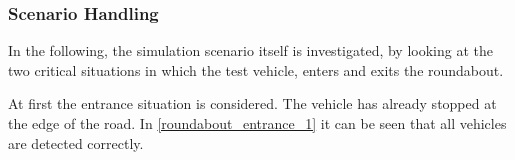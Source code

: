 \documentclass[11pt,oneside,openright]{mpreport}
\begin{document}
\subsubsection{Scenario Handling}
In the following, the simulation scenario itself is investigated, by looking at the two critical situations in which the test vehicle, enters and exits the roundabout.

At first the entrance situation is considered. The vehicle has already stopped at the edge of the road. In \cref{roundabout_entrance_1} it can be seen that all vehicles are detected correctly.
\end{document}
